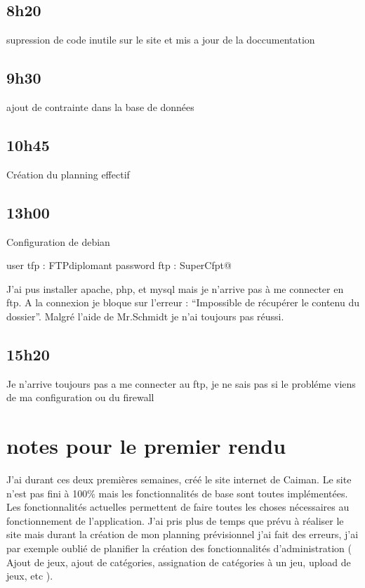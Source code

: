 \documentclass[a4paper,12pt,french]{sphinxmanual}
\begin{document}
\subsection{8h20}
\label{\detokenize{logbook:id54}}
\sphinxAtStartPar
supression de code inutile sur le site et mis a jour de la doccumentation


\subsection{9h30}
\label{\detokenize{logbook:id55}}
\sphinxAtStartPar
ajout de contrainte dans la base de données


\subsection{10h45}
\label{\detokenize{logbook:id56}}
\sphinxAtStartPar
Création du planning effectif


\subsection{13h00}
\label{\detokenize{logbook:id57}}
\sphinxAtStartPar
Configuration de debian

\sphinxAtStartPar
user tfp : FTPdiplomant
password ftp : SuperCfpt@

\sphinxAtStartPar
J’ai pus installer apache, php, et mysql mais je n’arrive pas à me connecter en ftp. A la connexion je bloque sur l’erreur : “Impossible de récupérer le contenu du dossier”. Malgré l’aide de Mr.Schmidt je n’ai toujours pas réussi.


\subsection{15h20}
\label{\detokenize{logbook:id58}}
\sphinxAtStartPar
Je n’arrive toujours pas a me connecter au ftp, je ne sais pas si le probléme viens de ma configuration ou du firewall


\section{notes pour le premier rendu}
\label{\detokenize{logbook:notes-pour-le-premier-rendu}}
\sphinxAtStartPar
J’ai durant ces deux premières semaines, créé le site internet de Caiman. Le site n’est pas fini à 100\% mais les fonctionnalités de base sont toutes implémentées. Les fonctionnalités actuelles permettent de faire toutes les choses nécessaires au fonctionnement de l’application. J’ai pris plus de temps que prévu à réaliser le site mais durant la création de mon planning prévisionnel j’ai fait des erreurs, j’ai par exemple oublié de planifier la création des fonctionnalités d’administration ( Ajout de jeux, ajout de catégories, assignation de catégories à un jeu, upload de jeux, etc ).
\end{document}

